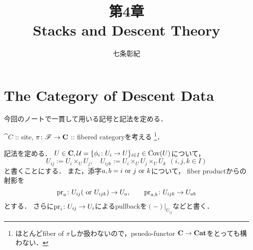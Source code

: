 \documentclass[a4paper]{jsarticle}
\begin{document}
\title{第4章 \\ Stacks and Descent Theory}
\author{七条彰紀}
\maketitle

\section{The Category of Descent Data}
    今回のノートで一貫して用いる記号と記法を定める．

    $\cat{C}$ :: site, 
    $\pi \colon \mathscr{F} \to \mathbf{C}$ :: fibered categoryを考える
    \footnote{ ほとんどfiber of $\pi$しか扱わないので，psuedo-functor $\mathbf{C} \to \mathbf{Cat}$をとっても構わない． }．

    記法を定める．
    $U \in \mathbf{C}, \mathcal{U}=\{\phi_i \colon U_i \to U\}_{i \in I} \in \operatorname{Cov}(U)$について，
    \[ U_{ij}:=U_i \times_U U_j, \quad U_{ijk}:=U_i \times_U U_j \times_U U_k \ \ (i,j,k \in I) \]
    と書くことにする．
    また，添字$a,b=i \text{ or } j \text{ or } k$について，
    fiber productからの射影を
    \[ \operatorname{pr}_{a} \colon U_{ij} (\text{ or } U_{ijk}) \to U_{a}, \qquad \operatorname{pr}_{a,b} \colon U_{ijk} \to U_{ab} \]
    とする．
    さらに$\operatorname{pr}_{i} \colon U_{ij} \to U_{i}$によるpullbackを$(-)|_{U_{ij}}$などと書く．
\end{document}
